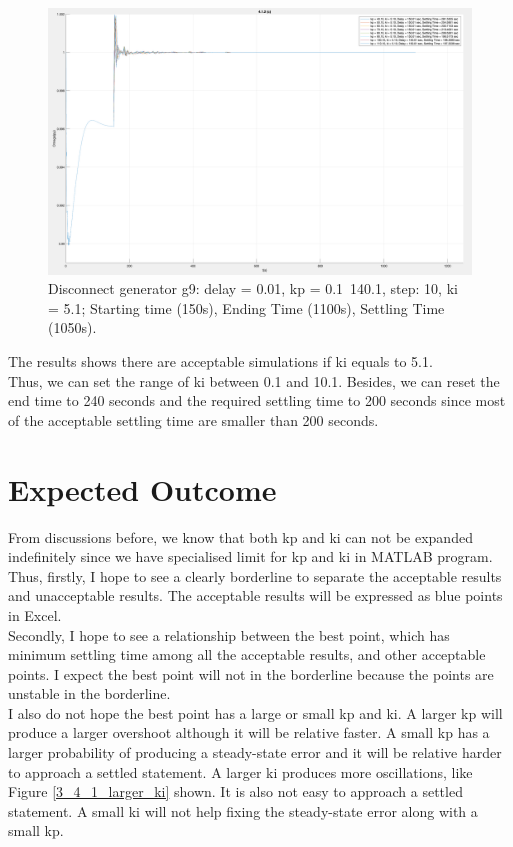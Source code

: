 \documentclass{report}
\begin{document}
\begin{figure}[htbp]
\centering
\includegraphics[width = .819\textwidth]{figure/4_1_2_c.png}
\caption{Disconnect generator g9: delay = 0.01, kp = 0.1~140.1, step: 10, ki = 5.1; Starting time (150s), Ending Time (1100s), Settling Time (1050s).}
\label{4_1_2_c}
\end{figure}

The results shows there are acceptable simulations if ki equals to 5.1. \\

Thus, we can set the range of ki between 0.1 and 10.1. 
Besides, we can reset the end time to 240 seconds and the required settling time to 200 seconds since most of the acceptable settling time are smaller than 200 seconds.\\

\section{Expected Outcome} %
\label{section4.2}
From discussions before, we know that both kp and ki can not be expanded indefinitely since we have specialised limit for kp and ki in MATLAB program. Thus, firstly, I hope to see a clearly borderline to separate the acceptable results and unacceptable results. The acceptable results will be expressed as blue points in Excel. \\

Secondly, I hope to see a relationship between the best point, which has minimum settling time among all the acceptable results, and other acceptable points. I expect the best point will not in the borderline because the points are unstable in the borderline. \\

I also do not hope the best point has a large or small kp and ki. A larger kp will produce a larger overshoot although it will be relative faster. A small kp has a larger probability of producing a steady-state error and it will be relative harder to approach a settled statement. A larger ki produces more oscillations, like Figure \textcolor{red}{\ref{3_4_1_larger_ki}} shown. It is also not easy to approach a settled statement. A small ki will not help fixing the steady-state error along with a small kp. \\
\end{document}
